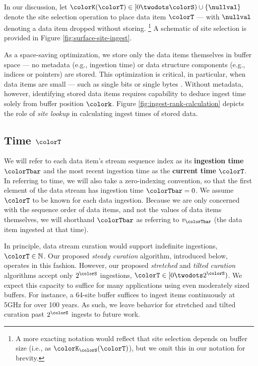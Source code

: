 In our discussion, let $\colorK(\colorT) \in [0\twodots\colorS)\cup\{\nullval\}$ denote the site selection operation to place data item $\colorT$ --- with $\nullval$ denoting a data item dropped without storing.%
\footnote{%
A more exacting notation would reflect that site selection depends on buffer size (i.e., as $\colorK_{\colorS}(\colorT)$), but we omit this in our notation for brevity.
}
A schematic of site selection is provided in Figure \ref{fig:surface-site-ingest}.

As a space-saving optimization, we store only the data items themselves in buffer space --- no metadata (e.g., ingestion time) or data structure components (e.g., indices or pointers) are stored.
This optimization is critical, in particular, when data items are small --- such as single bits or single bytes \citep{moreno2022hereditary}.
Without metadata, however, identifying stored data items requires capability to deduce ingest time solely from buffer position $\colork$.
Figure \ref{fig:ingest-rank-calculation} depicts the role of \textit{site lookup} in calculating ingest times of stored data.

\subsection{Time $\colorT$}
\label{sec:notation-time}

We will refer to each data item's stream sequence index as its \textbf{ingestion time} $\colorTbar$ and the most recent ingestion time as the \textbf{current time} $\colorT$.
In referring to time, we will also take a zero-indexing convention, so that the first element of the data stream has ingestion time $\colorTbar=0$.
We assume $\colorT$ to be known for each data ingestion.
Because we are only concerned with the sequence order of data items, and not the values of data items themselves, we will shorthand $\colorTbar$ as referring to $v_{\colorTbar}$ (the data item ingested at that time).

In principle, data stream curation would support indefinite ingestions, $\colorT \in \mathbb{N}$.
Our proposed \textit{steady curation} algorithm, introduced below, operates in this fashion.
However, our proposed \textit{stretched} and \textit{tilted curation} algorithms accept only $2^{\colorS}$ ingestions, $\colorT \in [0 \twodots 2^{\colorS})$.
We expect this capacity to suffice for many applications using even moderately sized buffers.
For instance, a 64-site buffer suffices to ingest items continuously at 5GHz for over 100 years.
As such, we leave behavior for stretched and tilted curation past $2^{\colorS}$ ingests to future work.

